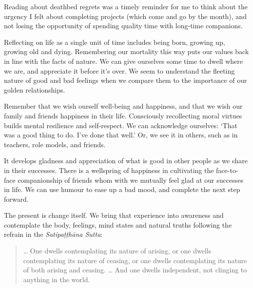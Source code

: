 Reading about deathbed regrets was a timely reminder for me to think
about the urgency I felt about completing projects (which come and go by
the month), and not losing the opportunity of spending quality time with
long-time companions.

Reflecting on life as a single unit of time includes being born, growing
up, growing old and dying. Remembering our mortality this way puts our
values back in line with the facts of nature. We can give ourselves some
time to dwell where we are, and appreciate it before it's over. We seem
to understand the fleeting nature of good and bad feelings when we
compare them to the importance of our golden relationships.

\clearpage

Remember that we wish ourself well-being and happiness, and that we wish
our family and friends happiness in their life. Consciously recollecting
moral virtues builds mental resilience and self-respect. We can
acknowledge ourselves: `That was a good thing to do. I've done that
well.' Or, we see it in others, such as in teachers, role models, and
friends.

It develops gladness and appreciation of what is good in other people as
we share in their successes. There is a wellspring of happiness in
cultivating the face-to-face companionship of friends whom with we
mutually feel glad at our successes in life. We can use humour to ease
up a bad mood, and complete the next step forward.

The present is change itself. We bring that experience into awareness
and contemplate the body, feelings, mind states and natural truths
following the refrain in the \emph{Satipaṭṭhāna Sutta}:

\begin{quote}
\ldots{} One dwells contemplating its nature of arising, or one dwells
contemplating its nature of ceasing, or one dwells contemplating its
nature of both arising and ceasing. \ldots{} And one dwells independent,
not clinging to anything in the world.

\bigskip

\end{quote}
